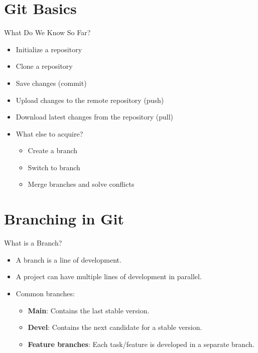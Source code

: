 \section{Git Basics}

\begin{frame}{What Do We Know So Far?}
  \begin{itemize}
    \item Initialize a repository
    \item Clone a repository
    \item Save changes (commit)
    \item Upload changes to the remote repository (push)
    \item Download latest changes from the repository (pull)
    \item What else to acquire?
    \begin{itemize}
        \item Create a branch
        \item Switch to branch
        \item Merge branches and solve conflicts
    \end{itemize}
  \end{itemize}
\end{frame}

\section{Branching in Git}

\begin{frame}{What is a Branch?}
  \begin{itemize}
    \item A branch is a line of development.
    \item A project can have multiple lines of development in parallel.
    \item Common branches:
      \begin{itemize}
        \item \textbf{Main}: Contains the last stable version.
        \item \textbf{Devel}: Contains the next candidate for a stable version.
        \item \textbf{Feature branches}: Each task/feature is developed in a separate branch.
      \end{itemize}
  \end{itemize}
\end{frame}

